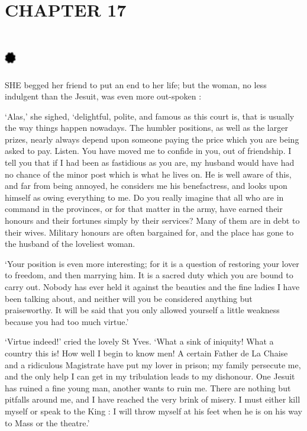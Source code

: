 \documentclass{article}
\begin{document}
\begin{center}
\section*{\textbf{CHAPTER 17  }}

\section*{%
\includegraphics[width=14pt, height=15pt, keepaspectratio=true]{Zadig or L'Ingenu - Voltaire-fig039.jpg}
}

 

SHE begged her friend to put an end to her life; but the woman, no less indulgent 
than the Jesuit, was even more out-spoken : 

`Alas,' she sighed, `delightful, polite, and famous as this court is, that is usually 
the way things happen nowadays. The humbler positions, as well as the larger prizes, 
nearly always depend upon someone paying the price which you are being asked to 
pay. Listen. You have moved me to confide in you, out of friendship. I tell you 
that if I had been as fastidious as you are, my husband would have had no chance 
of the minor post which is what he lives on. He is well aware of this, and far 
from being annoyed, he considers me his benefactress, and looks upon himself as 
owing everything to me. Do you really imagine that all who are in command in the 
provinces, or for that matter in the army, have earned their honours and their 
fortunes simply by their services? Many of them are in debt to their wives. Military 
honours are often bargained for, and the place has gone to the husband of the loveliest 
woman. 

`Your position is even more interesting; for it is a question of restoring your 
lover to freedom, and then marrying him. It is a sacred duty which you are bound 
to carry out. Nobody has ever held it against the beauties and the fine ladies 
I have been talking about, and neither will you be considered anything but praiseworthy. 
It will be said that you only allowed yourself a little weakness because you had 
too much virtue.' 

`Virtue indeed!' cried the lovely St Yves. `What a sink of iniquity! What a country 
this is! How well I begin to know men! A certain Father de La Chaise and a ridiculous 
Magistrate have put my lover in prison; my family persecute me, and the only help 
I can get in my tribulation leads to my dishonour. One Jesuit has ruined a fine 
young man, another wants to ruin me. There are nothing but pitfalls around me, 
and I have reached the very brink of misery. I must either kill myself or speak 
to the King : I will throw myself at his feet when he is on his way to Mass or 
the theatre.' 


\end{center}
\end{document}
